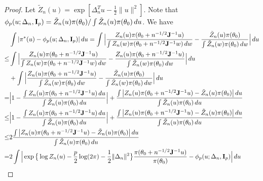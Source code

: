 \documentclass[3p]{elsarticle}
\theoremstyle{plain}
\theoremstyle{definition}
\theoremstyle{remark}
\begin{document}
\begin{proof}
    Let $\tilde{Z}_n(u)=\exp[\Delta_n^T u - \frac{1}{2}\|u\|^2]$.
    Note that $\phi_p(u;\Delta_n,\mathbf{I}_p)=\tilde{Z}_n(u)\pi(\theta_0)/\int \tilde{Z}_n(u) \pi(\theta_0)\, du$.
    We have
    $$
    \begin{aligned}
        &\int | \pi^*(u) -\phi_p(u;\Delta_n,\mathbf{I}_p)| \, du
        =
    \int \Big| \frac{
Z_n(u) \pi(\theta_0+n^{-1/2} \mathbf{J}^{-1}u)
}{
    \int Z_n(w) \pi(\theta_0+n^{-1/2} \mathbf{J}^{-1}w) \, dw
}
        -
        \frac{\tilde{Z}_n(u)\pi(\theta_0)}{\int \tilde{Z}_n(w) \pi(\theta_0)\, dw}
        \Big| \, du
        \\
        \leq&
    \int \Big|
        \frac{
Z_n(u) \pi(\theta_0+n^{-1/2} \mathbf{J}^{-1}u)
}{
    \int Z_n(w) \pi(\theta_0+n^{-1/2} \mathbf{J}^{-1}w) \, dw
}
        -
        \frac{
Z_n(u) \pi(\theta_0+n^{-1/2} \mathbf{J}^{-1}u)
}{
\int \tilde{Z}_n(w) \pi(\theta_0)\, dw
}
        \Big| \, du
        \\
        &+
    \int \Big| 
        \frac{
Z_n(u) \pi(\theta_0+n^{-1/2} \mathbf{J}^{-1}u)
}{
\int \tilde{Z}_n(w) \pi(\theta_0)\, dw
}
        -
        \frac{\tilde{Z}_n(u)\pi(\theta_0)}{\int \tilde{Z}_n(w) \pi(\theta_0)\, dw}
        \Big| \, du\\
        =&
\Big| 
1-
        \frac{
    \int Z_n(u) \pi(\theta_0+n^{-1/2} \mathbf{J}^{-1}u) \, du
}{
       \int \tilde{Z}_n(u)\pi(\theta_0) \, du
}
        \Big|
        +
        \frac{
    \int \big|
Z_n(u) \pi(\theta_0+n^{-1/2} \mathbf{J}^{-1}u)
        -
            \tilde{Z}_n(u) \pi(\theta_0)
        \big| \, du
            }{
            \int \tilde{Z}_n(u)\pi(\theta_0) \, du
        }\\
        \leq&
\Big| 
1-
        \frac{
    \int Z_n(u) \pi(\theta_0+n^{-1/2} \mathbf{J}^{-1}u) \, du
}{
       \int \tilde{Z}_n(u)\pi(\theta_0) \, du
}
        \Big|
        +
        \frac{
    \int \big|
Z_n(u) \pi(\theta_0+n^{-1/2} \mathbf{J}^{-1}u)
        -
            \tilde{Z}_n(u) \pi(\theta_0)
        \big| \, du
            }{
            \int \tilde{Z}_n(u)\pi(\theta_0) \, du
        }\\
        \leq&
        2\frac{
    \int \big|
Z_n(u) \pi(\theta_0+n^{-1/2} \mathbf{J}^{-1}u)
        -
            \tilde{Z}_n(u) \pi(\theta_0)
        \big| \, du
            }{
            \int \tilde{Z}_n(u)\pi(\theta_0) \, du
        }\\
        =&
        2
    \int \Big|
\exp\big\{\log Z_n(u) -\frac{p}{2}\log (2\pi)-\frac{1}{2}\|\Delta_n\|^2\big\}
\frac{\pi(\theta_0+n^{-1/2} \mathbf{J}^{-1}u)}{\pi(\theta_0)}
        -
        \phi_p(u;\Delta_n,\mathbf{I}_p)
        \Big| \, du
    \end{aligned}
    $$


\end{proof}
\end{document}
